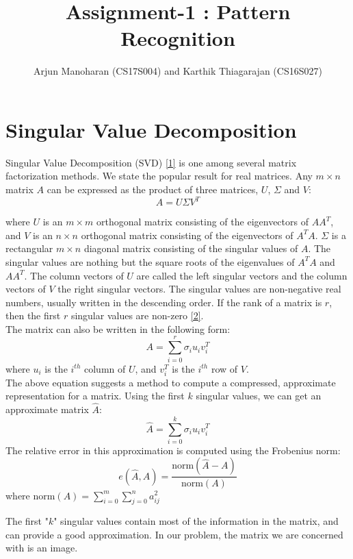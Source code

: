 \documentclass{article}
\title{Assignment-1 : Pattern Recognition}
\author{Arjun Manoharan (CS17S004) and Karthik Thiagarajan (CS16S027)}
\begin{document}
\maketitle

\tableofcontents

\newpage
\section{Singular Value Decomposition}
Singular Value Decomposition (SVD) \href{https://en.wikipedia.org/wiki/Singular_value_decomposition}{[1]} is one among several matrix factorization methods. We state the popular result for real matrices. Any $m \times n$ matrix $A$ can be expressed as the product of three matrices, $U$, $\Sigma$ and $V$:
$$
A = U \Sigma V^T
$$

where $U$ is an $m \times m$ orthogonal matrix consisting of the eigenvectors of $AA^T$, and $V$ is an $n \times n$ orthogonal matrix consisting of the eigenvectors of $A^TA$. $\Sigma$ is a rectangular $m \times n$  diagonal matrix consisting of the singular values of $A$. The singular values are nothing but the square roots of the eigenvalues of $A^TA$ and $AA^T$. The column vectors of $U$ are called the left singular vectors and the column vectors of $V$ the right singular vectors. The singular values are non-negative real numbers, usually written in the descending order. If the rank of a matrix is $r$, then the first $r$ singular values are non-zero \href{http://www.math.vt.edu/people/embree/cmda3606/chapter8.pdf}{[2]}.\\

The matrix can also be written in the following form:
$$
A = \sum \limits_{i = 0}^{r} \sigma_i u_i v_i^T
$$
where $u_i$ is the $i^{th}$ column of $U$, and $v_i^{T}$ is the $i^{th}$ row of $V$.\\

The above equation suggests a method to compute a compressed, approximate representation for a matrix. Using the first $k$ singular values, we can get an approximate matrix $\hat{A}$:
$$
\hat{A} = \sum \limits_{i = 0}^{k} \sigma_i u_i v_i^T
$$
The relative error in this approximation is computed using the Frobenius norm:
$$
e(\hat{A}, A) = \frac{\text{norm}(\hat{A} - A)}{\text{norm}(A)}
$$
where $\text{norm}(A) = \sum \limits_{i = 0}^{m} \sum \limits_{j=0}^{n} a_{ij}^{2}$

The first "$k$" singular values contain most of the information in the matrix, and can provide a good approximation. In our problem, the matrix we are concerned with is an image. 
\end{document}
